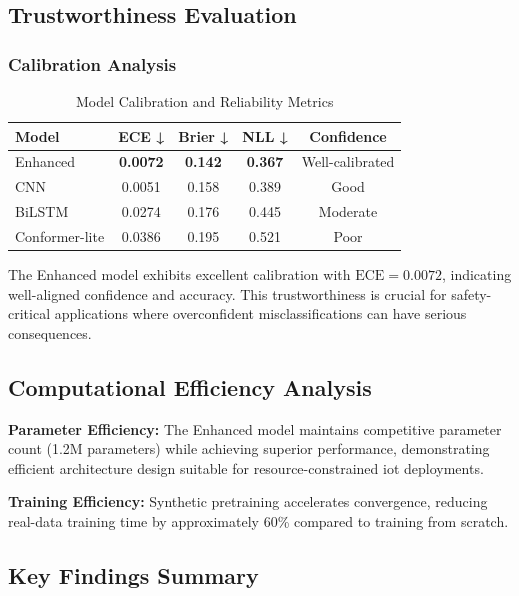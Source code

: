 \documentclass[journal]{IEEEtran}
\begin{document}
\subsection{Trustworthiness Evaluation}

\subsubsection{Calibration Analysis}

\begin{table}[ht]
\centering
\caption{Model Calibration and Reliability Metrics}
\begin{tabular}{@{}lcccc@{}}
\toprule
Model & ECE ↓ & Brier ↓ & NLL ↓ & Confidence \\
\midrule
Enhanced & \textbf{0.0072} & \textbf{0.142} & \textbf{0.367} & Well-calibrated \\
CNN & 0.0051 & 0.158 & 0.389 & Good \\
BiLSTM & 0.0274 & 0.176 & 0.445 & Moderate \\
Conformer-lite & 0.0386 & 0.195 & 0.521 & Poor \\
\bottomrule
\end{tabular}
\label{tab:calibration}
\end{table}

The Enhanced model exhibits excellent calibration with $\text{ECE}=0.0072$, indicating well-aligned confidence and accuracy. This trustworthiness is crucial for safety-critical applications where overconfident misclassifications can have serious consequences.

\subsection{Computational Efficiency Analysis}

\textbf{Parameter Efficiency:} The Enhanced model maintains competitive parameter count (1.2M parameters) while achieving superior performance, demonstrating efficient architecture design suitable for resource-constrained \gls{iot} deployments.

\textbf{Training Efficiency:} Synthetic pretraining accelerates convergence, reducing real-data training time by approximately 60\% compared to training from scratch.

\subsection{Key Findings Summary}
\end{document}

